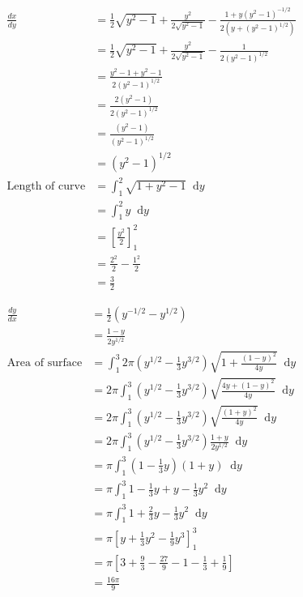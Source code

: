 \documentclass[12pt]{article}
\newcommand*\diff{\mathop{}\!\mathrm{d}}
\newenvironment{problem}[2][Problem]{\begin{trivlist}
\item[\hskip \labelsep {\bfseries #1}\hskip \labelsep {\bfseries #2.}]}{\end{trivlist}}
\begin{document}
\begin{problem}{5.b}
\end{problem}
\begin{align*}
\frac{dx}{dy}
&=
\frac{1}{2} \sqrt{y^2-1}
+
\frac{y^2}
{2\sqrt{y^2-1}}
-
\frac{
	1 + y(y^2-1)^{-1/2}
}
{
	2(y+(y^2-1)^{1/2})
}
\\
&=
\frac{1}{2} \sqrt{y^2-1}
+
\frac{y^2}
{2\sqrt{y^2-1}}
-
\frac{
	1
}
{
	2(y^2-1)^{1/2}
}
\\
&=
\frac{
	y^2 - 1 + y^2 - 1
}
{
	2(y^2-1)^{1/2}
}
\\
&=
\frac{
	2(y^2 - 1)
}
{
	2(y^2-1)^{1/2}
}
\\
&=
\frac{
	(y^2 - 1)
}
{
	(y^2-1)^{1/2}
}
\\
&=
(y^2-1)^{1/2}
\\
\text{Length of curve}
&=
\int_{1}^{2}
	\sqrt{1 + y^2 - 1}
\diff y
\\
&=
\int_{1}^{2}
	y
\diff y
\\
&=
\left[
	\frac{y^2}{2}
\right]_{1}^{2}
\\
&=
\frac{2^2}{2}
-
\frac{1^2}{2}
\\
&=
\frac{3}{2}
\end{align*}
\filbreak

\begin{problem}{6.a}
\end{problem}
\begin{align*}
\frac{dy}{dx} 
&=
\frac{1}{2}(y^{-1/2} - y^{1/2})\\
&=
\frac{1 - y}{2y^{1/2}}\\
\text{Area of surface} 
&=
\int_{1}^{3} 
	2\pi 
	(y^{1/2}-\frac{1}{3}y^{3/2})
	\sqrt{
		1 + \frac{(1 - y)^2}{4y}
	}
\diff y
\\
&=
2\pi 
\int_{1}^{3} 
	(y^{1/2}-\frac{1}{3}y^{3/2})
	\sqrt{
		\frac{4y + (1 - y)^2}{4y}
	}
\diff y
\\
&=
2\pi 
\int_{1}^{3} 
	(y^{1/2}-\frac{1}{3}y^{3/2})
	\sqrt{
		\frac{(1 + y)^2}{4y}
	}
\diff y
\\
&=
2\pi 
\int_{1}^{3} 
	(y^{1/2}-\frac{1}{3}y^{3/2})
	\frac{1 + y}{2y^{1/2}}
\diff y
\\
&=
\pi 
\int_{1}^{3} 
	(1-\frac{1}{3}y)
	(1 + y)
\diff y
\\
&=
\pi 
\int_{1}^{3} 
	1-\frac{1}{3}y + y - \frac{1}{3}y^2
\diff y
\\
&=
\pi 
\int_{1}^{3} 
	1 + \frac{2}{3}y - \frac{1}{3}y^2
\diff y
\\
&=
\pi 
\left[
	y + \frac{1}{3}y^2 - \frac{1}{9}y^3
\right]_{1}^{3} 
\\
&=
\pi 
\left[
	3 + \frac{9}{3} - \frac{27}{9}
	-1 - \frac{1}{3} + \frac{1}{9}
\right]
\\
&=
\frac{
	16\pi
}
{
	9
}
\end{align*}
\filbreak
\end{document}
